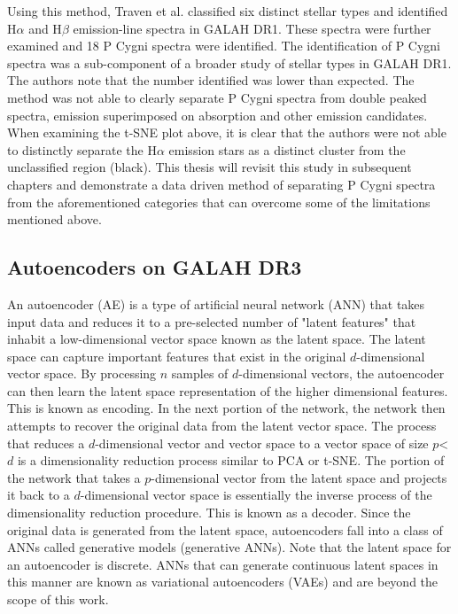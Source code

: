 Using this method, Traven et al. classified six distinct stellar types and identified H$\alpha$ and H$\beta$ emission-line spectra in GALAH DR1. These spectra were further examined and 18 P Cygni spectra were identified. The identification of P Cygni spectra was a sub-component of a broader study of stellar types in GALAH DR1. The authors note that the number identified was lower than expected. The method was not able to clearly separate P Cygni spectra from double peaked spectra, emission superimposed on absorption and other emission candidates. When examining the t-SNE plot above, it is clear that the authors were not able to distinctly separate the H$\alpha$ emission stars as a distinct cluster from the unclassified region (black). This thesis will revisit this study in subsequent chapters and demonstrate a data driven method of separating P Cygni spectra from the aforementioned categories that can overcome some of the limitations mentioned above.

\subsection{Autoencoders on GALAH DR3}

An autoencoder (AE) is a type of artificial neural network (ANN) that takes input data and reduces it to a pre-selected number of "latent features" that inhabit a low-dimensional vector space known as the latent space. The latent space can capture important features that exist in the original $d$-dimensional vector space. By processing $n$ samples of $d$-dimensional vectors, the autoencoder can then learn the latent space representation of the higher dimensional features. This is known as encoding. In the next portion of the network, the network then attempts to recover the original data from the latent vector space. The process that reduces a $d$-dimensional vector and vector space to a vector space of size $p$<$d$ is a dimensionality reduction process similar to PCA or t-SNE. The portion of the network that takes a $p$-dimensional vector from the latent space and projects it back to a $d$-dimensional vector space is essentially the inverse process of the dimensionality reduction procedure. This is known as a decoder. Since the original data is generated from the latent space, autoencoders fall into a class of ANNs called generative models (generative ANNs). Note that the latent space for an autoencoder is discrete. ANNs that can generate continuous latent spaces in this manner are known as variational autoencoders (VAEs) and are beyond the scope of this work. 

